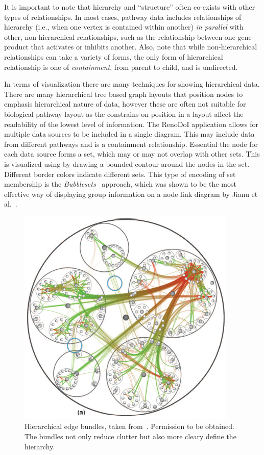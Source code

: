 \documentclass[journal]{vgtc}                %
\begin{document}
It is important to note that hierarchy and ``structure'' often co-exists with other types of relationships. In most cases, pathway data includes relationships of hierarchy (i.e., when one vertex is contained within another) \textit{in parallel} with other, non-hierarchical relationships, such as the relationship between one gene product that activates or inhibits another. Also, note that while non-hierarchical relationships can take a variety of forms, the only form of hierarchical relationship is one of \textit{containment}, from parent to child, and is undirected.

In terms of visualization there are many techniques for showing hierarchical data.
There are many hierarchical tree based graph layouts that position nodes to emphasis hierarchical nature of data, however these are often not suitable for biological pathway layout as the constrains on position in a layout affect the readability of the lowest level of information.
The RenoDoI application allows for multiple data sources to be included in a single diagram. 
This may include data from different pathways and is a containment relationship. Essential the node for each data source forms a set, which may or may not overlap with other sets.  
This is visualized using by drawing a bounded contour around the nodes in the set. Different border colors indicate different sets.
This type of encoding of  set membership is the \textit{Bubblesets}~\cite{Collins2009} approach, which was shown to be the most effective way of displaying group information on a node link diagram by Jianu et al.~\cite{Jianu2014}.


\begin{figure}[htb]
  \centering
  \includegraphics[width=0.5\columnwidth]{figures/Hierarchical_edge_bundles}
  \caption{\label{fig:Hierarchical_edge_bundles} Hierarchical edge bundles, taken from~\cite{Holten2006}. Permission to be obtained. The bundles not only reduce clutter but also more cleary define the hierarchy.}
\end{figure}
\end{document}
